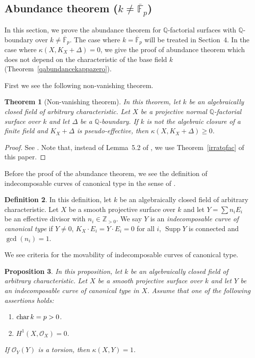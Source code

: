 \documentclass[12pt,twoside]{amsart}
\newcommand{\Supp}[0]{{\operatorname{Supp}}}
\newtheorem{thm}{Theorem}[section]
\newtheorem{prop}[thm]{Proposition}
\theoremstyle{definition}
\newtheorem{dfn}[thm]{Definition}
\newcommand{\Q}{$\mathbb{Q}$}
\begin{document}
\subsection{Abundance theorem ($k\neq \overline{\mathbb F}_p$)}

In this section, we prove the abundance theorem for 
\Q-factorial surfaces with \Q-boundary over $k\neq\overline{\mathbb{F}}_p$. 
The case where $k=\overline{\mathbb{F}}_p$ will be treated in Section~4. 
In the case where $\kappa(X, K_X+\Delta)=0$, 
we give the proof of abundance theorem which does not depend 
on the characteristic of the base field $k$ (Theorem~\ref{qabundancekappazero}). 

First we see the following non-vanishing theorem. 

\begin{thm}[Non-vanishing theorem]\label{nonv}
In this theorem, let $k$ be an algebraically closed field of arbitrary characteristic. 
Let $X$ be a projective normal \Q-factorial surface over $k$ and 
let $\Delta$ be a \Q-boundary. 
If $k$ is not the algebraic closure of a finite field and 
$K_X+\Delta$ is pseudo-effective, then $\kappa(X, K_X+\Delta) \geq 0$.
\end{thm}

\begin{proof}
See \cite[Theorem~5.1, Lemma~5.2]{Fujino}. 
Note that, instead of Lemma~5.2 of \cite{Fujino}, 
we use Theorem~\ref{irratqfac} of this paper.
\end{proof}


Before the proof of the abundance theorem, 
we see the definition of indecomposable curves of canonical type 
in the sense of \cite[P.330]{Mum}. 


\begin{dfn}
In this definition, let $k$ be an algebraically closed field of arbitrary characteristic. 
Let $X$ be a smooth projective surface over $k$ and 
let $Y=\sum n_iE_i$ be an effective divisor with $n_i\in \mathbb Z_{>0}$. 
We say $Y$ is an {\em indecomposable curve of canonical type} if 
$Y\neq 0$, $K_X\cdot E_i=Y\cdot E_i=0$ for all $i$, $\Supp Y$ is connected and $\gcd(n_i)=1$.
\end{dfn}


We see criteria for the movability of 
indecomposable curves of canonical type. 


\begin{prop}\label{icct1}
In this proposition, 
let $k$ be an algebraically closed field 
of arbitrary characteristic. 
Let $X$ be a smooth projective surface over $k$ and 
let $Y$ be an indecomposable curve of canonical type in $X$. 
Assume that one of the following assertions holds: 
\begin{enumerate}
\item{${\rm char}\,k=p>0$.}
\item{$H^1(X, \mathcal O_X)=0$.}
\end{enumerate}
If $\mathcal{O}_Y(Y)$ is a torsion, then $\kappa(X, Y)=1$. 
\end{prop}
\end{document}
